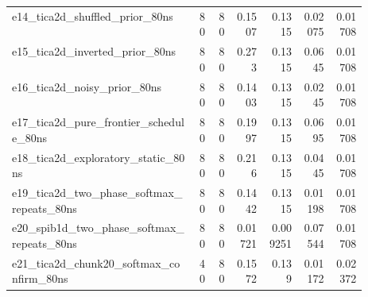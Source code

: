 \begin{longtable}{@{}p{0.52\linewidth}rrrrrr@{}}
e14\_tica2d\_shuffled\_prior\_80ns & 80 & 80 & 0.1507 & 0.1315 & 0.02075 & 0.01708 \\
e15\_tica2d\_inverted\_prior\_80ns & 80 & 80 & 0.273 & 0.1315 & 0.0645 & 0.01708 \\
e16\_tica2d\_noisy\_prior\_80ns & 80 & 80 & 0.1403 & 0.1315 & 0.0245 & 0.01708 \\
e17\_tica2d\_pure\_frontier\_schedule\_80ns & 80 & 80 & 0.1997 & 0.1315 & 0.0695 & 0.01708 \\
e18\_tica2d\_exploratory\_static\_80ns & 80 & 80 & 0.216 & 0.1315 & 0.0445 & 0.01708 \\
e19\_tica2d\_two\_phase\_softmax\_repeats\_80ns & 80 & 80 & 0.1442 & 0.1315 & 0.01198 & 0.01708 \\
e20\_spib1d\_two\_phase\_softmax\_repeats\_80ns & 80 & 80 & 0.01721 & 0.009251 & 0.07544 & 0.01708 \\
e21\_tica2d\_chunk20\_softmax\_confirm\_80ns & 40 & 80 & 0.1572 & 0.139 & 0.01172 & 0.02372 \\
\end{longtable}
